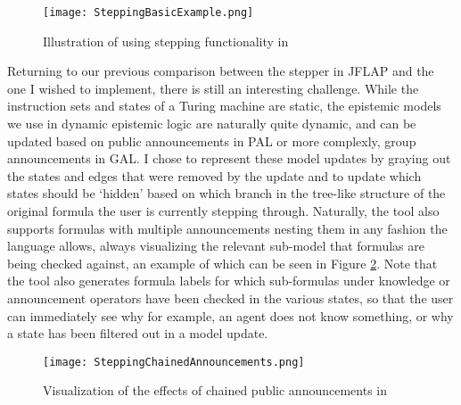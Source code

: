 \begin{figure}[H]
	\label{fig:stepperBasic}
	\caption{Illustration of using stepping functionality in \cname{}}
	\texttt{[image: SteppingBasicExample.png]}
\end{figure}


Returning to our previous comparison between the stepper in JFLAP and the one I wished to implement, there is still an interesting challenge. While the instruction sets and states of a Turing machine are static, the epistemic models we use in dynamic epistemic logic are naturally quite dynamic, and can be updated based on public announcements in PAL or more complexly, group announcements in GAL. I chose to represent these model updates by graying out the states and edges that were removed by the update and to update which states should be `hidden' based on which branch in the tree-like structure of the original formula the user is currently stepping through. Naturally, the tool also supports formulas with multiple announcements nesting them in any fashion the language allows, always visualizing the relevant sub-model that formulas are being checked against, an example of which can be seen in Figure \ref{fig:stepperUpdates}. Note that the tool also generates formula labels for which sub-formulas under knowledge or announcement operators have been checked in the various states, so that the user can immediately see why for example, an agent does not know something, or why a state has been filtered out in a model update.

\begin{figure}[H]
	\label{fig:stepperUpdates}
	\caption{Visualization of the effects of chained public announcements in \cname{}}
	\texttt{[image: SteppingChainedAnnouncements.png]}
\end{figure}
 





